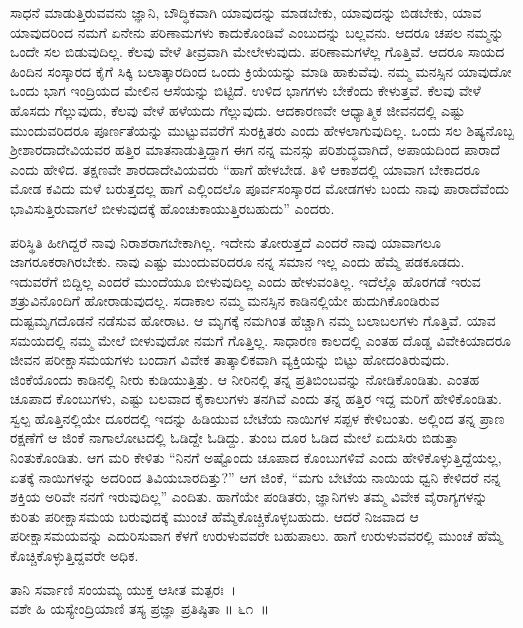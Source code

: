 ಸಾಧನೆ ಮಾಡುತ್ತಿರುವವನು ಜ್ಞಾನಿ, ಬೌದ್ಧಿಕವಾಗಿ ಯಾವುದನ್ನು ಮಾಡಬೇಕು, ಯಾವು\-ದನ್ನು ಬಿಡಬೇಕು, ಯಾವ ಯಾವುದರಿಂದ ನಮಗೆ ಏನೇನು ಪರಿಣಾಮಗಳು ಕಾದುಕೊಂಡಿವೆ ಎಂಬುದನ್ನು ಬಲ್ಲವನು. ಆದರೂ ಚಪಲ ನಮ್ಮನ್ನು ಒಂದೇ ಸಲ ಬಿಡುವುದಿಲ್ಲ. ಕೆಲವು ವೇಳೆ ತೀವ್ರವಾಗಿ ಮೇಲೇಳುವುದು. ಪರಿಣಾಮಗಳೆಲ್ಲ ಗೊತ್ತಿವೆ. ಆದರೂ ಸಾಯದ ಹಿಂದಿನ ಸಂಸ್ಕಾರದ ಕೈಗೆ ಸಿಕ್ಕಿ ಬಲಾತ್ಕಾರದಿಂದ ಒಂದು ಕ್ರಿಯೆಯನ್ನು ಮಾಡಿ ಹಾಕುವೆವು. ನಮ್ಮ ಮನಸ್ಸಿನ ಯಾವುದೋ ಒಂದು ಭಾಗ ಇಂದ್ರಿಯದ ಮೇಲಿನ ಆಸೆಯನ್ನು ಬಿಟ್ಟಿದೆ. ಉಳಿದ ಭಾಗಗಳು ಬೇಕೆಂದು ಕೇಳುತ್ತವೆ. ಕೆಲವು ವೇಳೆ ಹೊಸದು ಗೆಲ್ಲುವುದು, ಕೆಲವು ವೇಳೆ ಹಳೆಯದು ಗೆಲ್ಲುವುದು. ಆದಕಾರಣವೇ ಆಧ್ಯಾತ್ಮಿಕ ಜೀವನದಲ್ಲಿ ಎಷ್ಟು ಮುಂದುವರಿದರೂ ಪೂರ್ಣತೆಯನ್ನು ಮುಟ್ಟುವವರೆಗೆ ಸುರಕ್ಷಿತರು ಎಂದು ಹೇಳಲಾಗುವುದಿಲ್ಲ. ಒಂದು ಸಲ ಶಿಷ್ಯನೊಬ್ಬ ಶ‍್ರೀಶಾರದಾದೇವಿಯವರ ಹತ್ತಿರ ಮಾತನಾಡುತ್ತಿದ್ದಾಗ ಈಗ ನನ್ನ ಮನಸ್ಸು ಪರಿಶುದ್ಧವಾಗಿದೆ, ಅಪಾಯದಿಂದ ಪಾರಾದೆ ಎಂದು ಹೇಳಿದ. ತಕ್ಷಣವೇ ಶಾರದಾದೇವಿಯವರು “ಹಾಗೆ ಹೇಳಬೇಡ. ತಿಳಿ ಆಕಾಶದಲ್ಲಿ ಯಾವಾಗ ಬೇಕಾದರೂ ಮೋಡ ಕವಿದು ಮಳೆ ಬರುತ್ತದಲ್ಲ ಹಾಗೆ ಎಲ್ಲಿಂದಲೊ ಪೂರ್ವಸಂಸ್ಕಾರದ ಮೋಡಗಳು ಬಂದು ನಾವು ಪಾರಾದೆವೆಂದು ಭಾವಿಸುತ್ತಿರುವಾಗಲೆ ಬೀಳುವುದಕ್ಕೆ ಹೊಂಚುಕಾಯುತ್ತಿರಬಹುದು” ಎಂದರು.

ಪರಿಸ್ಥಿತಿ ಹೀಗಿದ್ದರೆ ನಾವು ನಿರಾಶರಾಗಬೇಕಾಗಿಲ್ಲ. ಇದೇನು ತೋರುತ್ತದೆ ಎಂದರೆ ನಾವು ಯಾವಾಗಲೂ ಜಾಗರೂಕರಾಗಿರಬೇಕು. ನಾವು ಎಷ್ಟು ಮುಂದುವರಿದರೂ ನನ್ನ ಸಮಾನ ಇಲ್ಲ ಎಂದು ಹೆಮ್ಮೆ ಪಡಕೂಡದು. ಇದುವರೆಗೆ ಬಿದ್ದಿಲ್ಲ ಎಂದರೆ ಮುಂದೆಯೂ ಬೀಳುವುದಿಲ್ಲ ಎಂದು ಹೇಳುವಂತಿಲ್ಲ. ಇದೆಲ್ಲೊ ಹೊರಗಡೆ ಇರುವ ಶತ್ರುವಿನೊಂದಿಗೆ ಹೋರಾಡುವುದಲ್ಲ. ಸದಾಕಾಲ ನಮ್ಮ ಮನಸ್ಸಿನ ಕಾಡಿನಲ್ಲಿಯೇ ಹುದುಗಿಕೊಂಡಿರುವ ದುಷ್ಟಮೃಗದೊಡನೆ ನಡೆಸುವ ಹೋರಾಟ. ಆ ಮೃಗಕ್ಕೆ ನಮಗಿಂತ ಹೆಚ್ಚಾಗಿ ನಮ್ಮ ಬಲಾಬಲಗಳು ಗೊತ್ತಿವೆ. ಯಾವ ಸಮಯದಲ್ಲಿ ನಮ್ಮ ಮೇಲೆ ಬೀಳುವುದೋ ನಮಗೆ ಗೊತ್ತಿಲ್ಲ. ಸಾಧಾರಣ ಕಾಲದಲ್ಲಿ ಎಂತಹ ದೊಡ್ಡ ವಿವೇಕಿಯಾದರೂ ಜೀವನ ಪರೀಕ್ಷಾಸಮಯಗಳು ಬಂದಾಗ ವಿವೇಕ ತಾತ್ಕಾಲಿಕವಾಗಿ ವ್ಯಕ್ತಿಯನ್ನು ಬಿಟ್ಟು ಹೋದಂತಿರುವುದು. ಜಿಂಕೆಯೊಂದು ಕಾಡಿನಲ್ಲಿ ನೀರು ಕುಡಿಯುತ್ತಿತ್ತು. ಆ ನೀರಿನಲ್ಲಿ ತನ್ನ ಪ್ರತಿಬಿಂಬವನ್ನು ನೋಡಿಕೊಂಡಿತು. ಎಂತಹ ಚೂಪಾದ ಕೊಂಬುಗಳು, ಎಷ್ಟು ಬಲವಾದ ಕೈಕಾಲುಗಳು ತನಗಿವೆ ಎಂದು ತನ್ನ ಹತ್ತಿರ ಇದ್ದ ಮರಿಗೆ ಹೇಳಿಕೊಂಡಿತು. ಸ್ವಲ್ಪ ಹೊತ್ತಿನಲ್ಲಿಯೇ ದೂರದಲ್ಲಿ ಇದನ್ನು ಹಿಡಿಯುವ ಬೇಟೆಯ ನಾಯಿಗಳ ಸಪ್ಪಳ ಕೇಳಿಬಂತು. ಅಲ್ಲಿಂದ ತನ್ನ ಪ್ರಾಣ ರಕ್ಷಣೆಗೆ ಆ ಜಿಂಕೆ ನಾಗಾಲೋಟದಲ್ಲಿ ಓಡಿದ್ದೇ ಓಡಿದ್ದು. ತುಂಬ ದೂರ ಓಡಿದ ಮೇಲೆ ಏದುಸಿರು ಬಿಡುತ್ತಾ ನಿಂತುಕೊಂಡಿತು. ಆಗ ಮರಿ ಕೇಳಿತು “ನಿನಗೆ ಅಷ್ಟೊಂದು ಚೂಪಾದ ಕೊಂಬುಗಳಿವೆ ಎಂದು ಹೇಳಿಕೊಳ್ಳುತ್ತಿದ್ದೆಯಲ್ಲ, ಏತಕ್ಕೆ ನಾಯಿಗಳನ್ನು ಅದರಿಂದ ತಿವಿಯಬಾರದಿತ್ತು?” ಆಗ ಜಿಂಕೆ, “ಮಗು ಬೇಟೆಯ ನಾಯಿಯ ಧ್ವನಿ ಕೇಳಿದರೆ ನನ್ನ ಶಕ್ತಿಯ ಅರಿವೇ ನನಗೆ ಇರುವುದಿಲ್ಲ” ಎಂದಿತು. ಹಾಗೆಯೇ ಪಂಡಿತರು, ಜ್ಞಾನಿಗಳು ತಮ್ಮ ವಿವೇಕ ವೈರಾಗ್ಯಗಳನ್ನು ಕುರಿತು ಪರೀಕ್ಷಾಸಮಯ ಬರುವುದಕ್ಕೆ ಮುಂಚೆ ಹೆಮ್ಮೆಕೊಚ್ಚಿಕೊಳ್ಳಬಹುದು. ಆದರೆ ನಿಜವಾದ ಆ ಪರೀಕ್ಷಾಸಮಯವನ್ನು ಎದುರಿಸುವಾಗ ಕೆಳಗೆ ಉರುಳುವವರೇ ಬಹುಪಾಲು. ಹಾಗೆ ಉರುಳುವವರಲ್ಲಿ ಮುಂಚೆ ಹೆಮ್ಮೆ ಕೊಚ್ಚಿಕೊಳ್ಳುತ್ತಿದ್ದವರೇ ಅಧಿಕ.

\begin{shloka}
ತಾನಿ ಸರ್ವಾಣಿ ಸಂಯಮ್ಯ ಯುಕ್ತ ಆಸೀತ ಮತ್ಪರಃ~।\\ವಶೇ ಹಿ ಯಸ್ಯೇಂದ್ರಿಯಾಣಿ ತಸ್ಯ ಪ್ರಜ್ಞಾ ಪ್ರತಿಷ್ಠಿತಾ \hfill॥ ೬೧~॥
\end{shloka}

